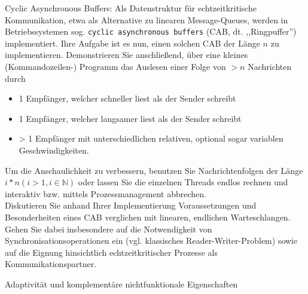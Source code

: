 \documentclass[10pt, a4paper]{exam}
\begin{document}
\begin{questions}
  \question Cyclic Asynchronous Buffers: Als Datenstruktur für echtzeitkritische Kommunikation, etwa als Alternative zu linearen Message-Queues, werden in Betriebssystemen sog. \texttt{cyclic asynchronous buffers} (CAB, dt. ,,Ringpuffer'') implementiert. Ihre Aufgabe ist es nun, einen solchen CAB der Länge $n$ zu implementieren. Demonstrieren Sie anschließend, über eine kleines (Kommandozeilen-) Programm das Auslesen einer Folge von $>n$ Nachrichten durch
  \begin{itemize}
    \item 1 Empfänger, welcher schneller liest als der Sender schreibt
    \item 1 Empfänger, welcher langsamer liest als der Sender schreibt
    \item > 1 Empfänger mit unterschiedlichen relativen, optional sogar variablen Geschwindigkeiten.
  \end{itemize}
  Um die Anschaulichkeit zu verbessern, benutzen Sie Nachrichtenfolgen der Länge $i*n( i > 1 ,i\in\mathbb{N})$ oder lassen Sie die einzelnen Threads endlos rechnen und interaktiv bzw. mittels Prozessmanagement abbrechen.\\
  Diskutieren Sie anhand Ihrer Implementierung Voraussetzungen und Besonderheiten eines CAB verglichen mit linearen, endlichen Warteschlangen. Gehen Sie dabei insbesondere auf die Notwendigkeit von Synchronisationsoperationen ein (vgl. klassisches Reader-Writer-Problem) sowie auf die Eignung hinsichtlich echtzeitkritischer Prozesse als Kommunikationspartner.
  \begin{solution}
  \end{solution}

  \question Adaptivität und komplementäre nichtfunktionale Eigenschaften
\end{questions}
\end{document}
